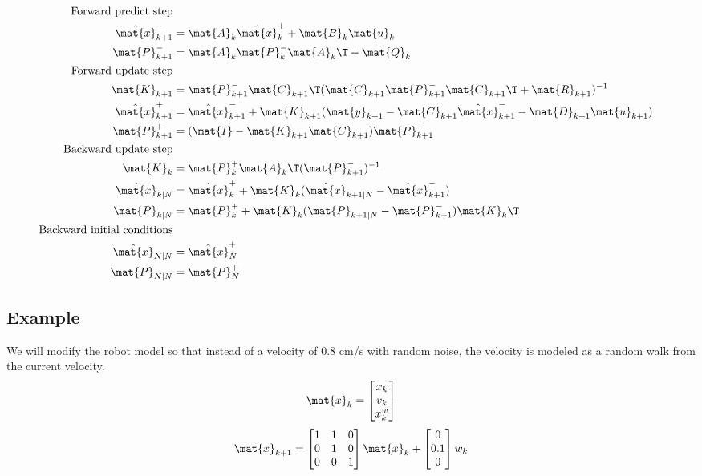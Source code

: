 \begin{theorem}
  \label{thm:kalman_smoother}
  \begin{align}
    \text{Forward predict step} \nonumber \\
    \hat{\mat{x}}_{k+1}^- &= \mat{A}_k\hat{\mat{x}}_k^+ + \mat{B}_k\mat{u}_k \\
    \mat{P}_{k+1}^- &= \mat{A}_k\mat{P}_k^-\mat{A}_k\T + \mat{Q}_k \\
    \text{Forward update step} \nonumber \\
    \mat{K}_{k+1} &=
      \mat{P}_{k+1}^-\mat{C}_{k+1}\T
        (\mat{C}_{k+1}\mat{P}_{k+1}^-\mat{C}_{k+1}\T + \mat{R}_{k+1})^{-1} \\
    \hat{\mat{x}}_{k+1}^+ &=
      \hat{\mat{x}}_{k+1}^- + \mat{K}_{k+1}(\mat{y}_{k+1} -
      \mat{C}_{k+1}\hat{\mat{x}}_{k+1}^- - \mat{D}_{k+1}\mat{u}_{k+1}) \\
    \mat{P}_{k+1}^+ &= (\mat{I} - \mat{K}_{k+1}\mat{C}_{k+1})\mat{P}_{k+1}^- \\
    \text{Backward update step} \nonumber \\
    \mat{K}_k &= \mat{P}_k^+ \mat{A}_k\T (\mat{P}_{k+1}^-)^{-1} \\
    \hat{\mat{x}}_{k|N} &= \hat{\mat{x}}_k^+ +
      \mat{K}_k(\hat{\mat{x}}_{k+1|N} - \hat{\mat{x}}_{k+1}^-) \\
    \mat{P}_{k|N} &=
      \mat{P}_k^+ + \mat{K}_k(\mat{P}_{k+1|N} - \mat{P}_{k+1}^-)\mat{K}_k\T \\
    \text{Backward initial conditions} \nonumber \\
    \hat{\mat{x}}_{N|N} &= \hat{\mat{x}}_N^+ \\
    \mat{P}_{N|N} &= \mat{P}_N^+
  \end{align}
\end{theorem}

\subsection{Example}

We will modify the robot model so that instead of a velocity of $0.8$ cm/s with
random noise, the velocity is modeled as a random walk from the current
velocity.
\begin{equation}
  \mat{x}_k =
  \begin{bmatrix}
    x_k \\
    v_k \\
    x_k^w
  \end{bmatrix}
\end{equation}
\begin{equation}
  \mat{x}_{k+1} =
  \begin{bmatrix}
    1 & 1 & 0 \\
    0 & 1 & 0 \\
    0 & 0 & 1
  \end{bmatrix} \mat{x}_k +
  \begin{bmatrix}
    0 \\
    0.1 \\
    0
  \end{bmatrix} w_k
\end{equation}


